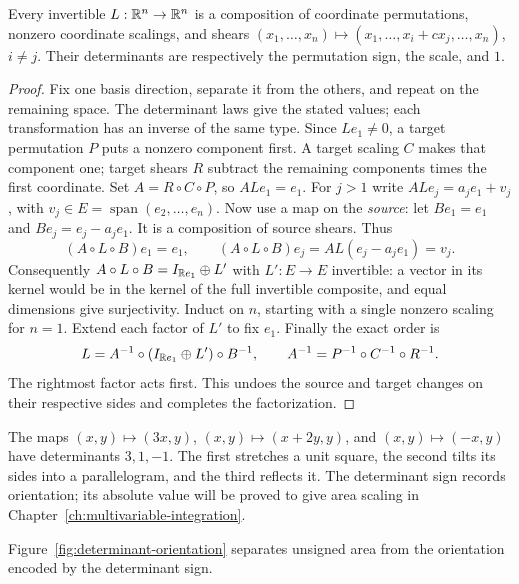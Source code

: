 \begin{lemma}\label{lem:elementary-factorization}
Every invertible $L:\mathbb{R}^n\to\mathbb{R}^n$ is a composition of coordinate
permutations, nonzero coordinate scalings, and shears
$(x_1,\ldots,x_n)\mapsto(x_1,\ldots,x_i+cx_j,\ldots,x_n)$, $i\ne j$.
Their determinants are respectively the permutation sign, the scale, and $1$.
\end{lemma}
\begin{proof}
Fix one basis direction, separate it from the others, and
repeat on the remaining space. The determinant laws give the stated values;
each transformation has an inverse of the same type.
Since $Le_1\ne0$, a target permutation $P$ puts a nonzero component first.
A target scaling $C$ makes that component one; target shears $R$ subtract
the remaining components times the first coordinate. Set $A=R\circ C\circ P$,
so $ALe_1=e_1$. For $j>1$ write $ALe_j=a_je_1+v_j$, with
$v_j\in E=\operatorname{span}(e_2,\ldots,e_n)$.
Now use a map on the \emph{source}: let $Be_1=e_1$ and
$Be_j=e_j-a_je_1$. It is a composition of source shears. Thus
\[
(A\circ L\circ B)e_1=e_1,\qquad
(A\circ L\circ B)e_j=AL(e_j-a_je_1)=v_j.
\]
Consequently $A\circ L\circ B=I_{\mathbb{R} e_1}\oplus L'$ with
$L':E\to E$ invertible: a vector in its kernel would be in the kernel
of the full invertible composite, and equal dimensions give surjectivity.
Induct on $n$, starting with a single nonzero scaling for $n=1$.
Extend each factor of $L'$ to fix $e_1$. Finally the exact order is
\[
L=A^{-1}\circ(I_{\mathbb{R} e_1}\oplus L')\circ B^{-1},\qquad
A^{-1}=P^{-1}\circ C^{-1}\circ R^{-1}.
\]
The rightmost factor acts first. This undoes the source and target changes
on their respective sides and completes the factorization.
\end{proof}

\begin{example}
The maps $(x,y)\mapsto(3x,y)$, $(x,y)\mapsto(x+2y,y)$, and
$(x,y)\mapsto(-x,y)$ have determinants $3,1,-1$. The first stretches a
unit square, the second tilts its sides into a parallelogram, and the third
reflects it. The determinant sign records orientation; its absolute value
will be proved to give area scaling in Chapter~\ref{ch:multivariable-integration}.
\end{example}

Figure~\ref{fig:determinant-orientation} separates unsigned area from
the orientation encoded by the determinant sign.

\FloatBarrier

